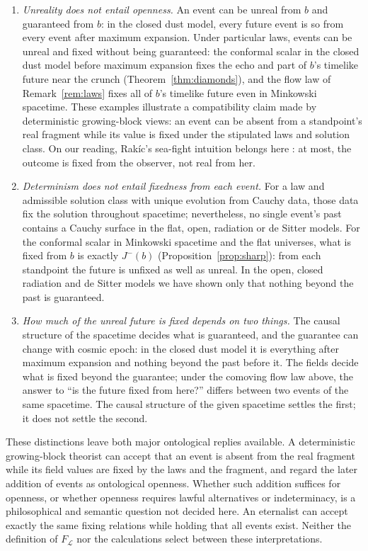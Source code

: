 \documentclass[11pt]{article}
\theoremstyle{definition}
\begin{document}
\begin{enumerate}
\item \emph{Unreality does not entail openness.} An event can be unreal from
$b$ and guaranteed from $b$: in the closed dust model, every future event is
so from every event after maximum expansion. Under particular laws, events
can be unreal and fixed without being guaranteed: the conformal scalar in
the closed dust model before maximum expansion fixes the echo and part of
$b$'s timelike future near the crunch (Theorem~\ref{thm:diamonds}), and the
flow law of Remark~\ref{rem:laws} fixes all of $b$'s timelike future even in
Minkowski spacetime. These examples illustrate a compatibility claim made by
deterministic growing-block views: an event can be absent from a standpoint's
real fragment while its value is fixed under the stipulated laws and solution
class. On our reading, Rak\'ic's sea-fight intuition belongs here
\citep{Rakic1997}: at most, the outcome is fixed from the observer, not real
from her.
\item \emph{Determinism does not entail fixedness from each event.} For a law
and admissible solution class with unique evolution from Cauchy data, those
data fix the solution throughout spacetime; nevertheless, no single event's
past contains a Cauchy surface in the flat,
open, radiation or de Sitter models. For the conformal scalar in Minkowski
spacetime and the flat universes, what is fixed from $b$ is exactly
$J^-(b)$ (Proposition~\ref{prop:sharp}): from each standpoint the future is
unfixed as well as unreal. In the open, closed radiation and de Sitter models
we have shown only that nothing beyond the past is guaranteed.
\item \emph{How much of the unreal future is fixed depends on two things.}
The causal structure of the spacetime decides what is guaranteed, and the
guarantee can change with cosmic epoch: in the closed dust model it is
everything after maximum expansion and nothing beyond the past before it.
The fields decide what is fixed beyond the guarantee; under the comoving
flow law above, the answer to ``is the future fixed from here?'' differs
between two events of the same spacetime. The causal structure of the given
spacetime settles the first; it does not settle the second.
\end{enumerate}

These distinctions leave both major ontological replies available. A
deterministic growing-block theorist can accept that an event is absent from
the real fragment while its field values are fixed by the laws and the
fragment, and regard the later addition of events as ontological openness.
Whether such addition suffices for openness, or whether openness requires
lawful alternatives or indeterminacy, is a philosophical and semantic
question not decided here. An eternalist can accept exactly the same fixing
relations while holding that all events exist. Neither the definition of
$F_{\mathcal L}$ nor the calculations select between these interpretations.
\end{document}
